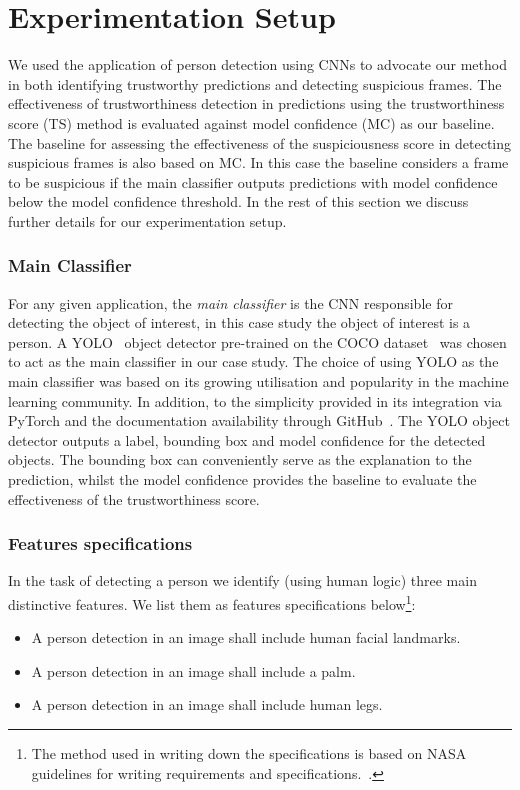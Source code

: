 \section{Experimentation Setup} \label{sec:experiment}
We used the application of person detection using CNNs to advocate our method in both identifying trustworthy predictions and detecting suspicious frames. 
%
The effectiveness of trustworthiness detection in predictions using the trustworthiness score (TS) method is evaluated against model confidence (MC) as our baseline. 
%
The baseline for assessing the effectiveness of the suspiciousness score in detecting suspicious frames is also based on MC.
%
In this case the baseline considers a frame to be suspicious if the main classifier outputs predictions with model confidence below the model confidence threshold. 
%
In the rest of this section we discuss further details for our experimentation setup.

\subsubsection{Main Classifier}
For any given application, the \textit{main classifier} is the CNN responsible for detecting the object of interest, in this case study the object of interest is a person. 
%
A YOLO~\cite{Redmon2015} object detector pre-trained on the COCO dataset~\cite{COCO_dataset} was chosen to act as the main classifier in our case study. The choice of using YOLO as the main classifier was based on its growing utilisation and popularity in the machine learning community. In addition, to the simplicity provided in its integration via PyTorch and the documentation availability through GitHub~\cite{Jocher_YOLOv5_by_Ultralytics_2020}. 
%
The YOLO object detector outputs a label, bounding box and model confidence for the detected objects. The bounding box can conveniently serve as the explanation to the prediction, whilst the model confidence provides the baseline to evaluate the effectiveness of the trustworthiness score.

\subsubsection{Features specifications}
In the task of detecting a person we identify (using human logic) three main distinctive features. We list them as features specifications below\footnote{The method used in writing down the specifications is based on NASA guidelines for writing requirements and specifications.~\cite{NASA_SystemsEngineeringHandbook}.}:
\begin{itemize}
    \item A person detection in an image shall include human facial landmarks.
    \item A person detection in an image shall include a palm.
    \item A person detection in an image shall include human legs.
\end{itemize}

